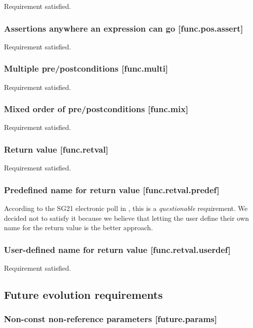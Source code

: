 Requirement satisfied.

\subsubsection{Assertions anywhere an expression can go [func.pos.assert]}

Requirement satisfied.

\subsubsection{Multiple pre/postconditions  [func.multi]}

Requirement satisfied.

\subsubsection{Mixed order of pre/postconditions  [func.mix]}

Requirement satisfied.

\subsubsection{Return value  [func.retval]}

Requirement satisfied.

\subsubsection{Predefined name for return value  [func.retval.predef]}

According to the SG21 electronic poll in \cite{P2885R2}, this is a \emph{questionable} requirement. We decided not to satisfy it because we believe that letting the user define their own name for the return value is the better approach.

\subsubsection{User-defined name for return value  [func.retval.userdef]}

Requirement satisfied.

\subsection{Future evolution requirements}

\subsubsection{Non-const non-reference parameters  [future.params]}

